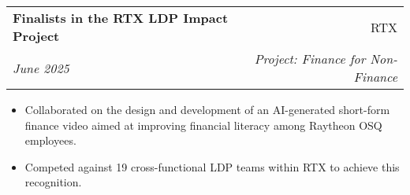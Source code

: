 \documentclass[a4paper,11pt]{article}
\makeatletter
\newcommand{\resumeItem}[2]{
  \item\small{
    \textbf{#1}{: #2 \vspace{-2pt}}
  }
}
\newcommand{\resumeItemCustom}[2]{
  \item\small{
    \textbf{#1}{ #2 \vspace{-2pt}}
  }
}
\newcommand{\resumeSubheading}[4]{
  \vspace{-1pt}\item
    \begin{tabular*}{0.97\textwidth}{l@{\extracolsep{\fill}}r}
      \textbf{#1} & #2 \\
      \textit{#3} & \textit{#4} \\
    \end{tabular*}\vspace{-5pt}
}
\newcommand{\resumeSubItem}[2]{\resumeItem{#1}{#2}\vspace{-3pt}}
\newcommand{\resumeSubHeadingListStart}{\begin{itemize}[leftmargin=*]}
\newcommand{\resumeSubHeadingListEnd}{\end{itemize}}
\newcommand{\resumeItemListStart}{\begin{itemize}}
\newcommand{\resumeItemListEnd}{\end{itemize}\vspace{-5pt}}
\makeatother
\begin{document}
    \resumeSubheading
            {Finalists in the RTX LDP Impact Project}
		{RTX}{June 2025}
            {Project: Finance for Non-Finance}
            \resumeItemListStart
        \resumeItemCustom{}{Collaborated on the design and development of an AI-generated short-form finance video aimed at improving financial literacy among Raytheon OSQ employees.}
        \resumeItemCustom{}{Competed against 19 cross-functional LDP teams within RTX to achieve this recognition.}
		\resumeItemListEnd
%

\end{document}
